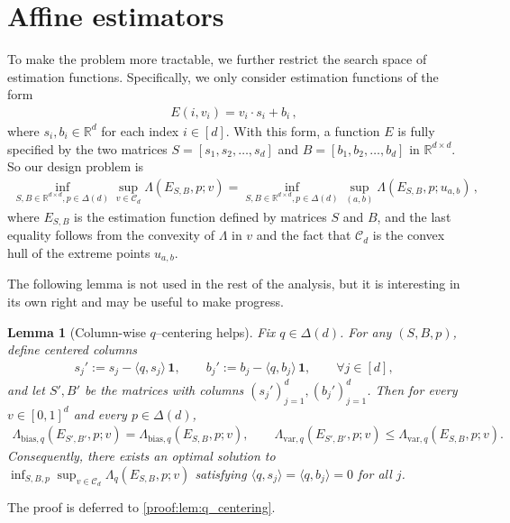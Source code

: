 \documentclass{article}
\theoremstyle{plain}
\newtheorem{lemma}[theorem]{Lemma}
\theoremstyle{definition}
\theoremstyle{plain}
\newcommand{\R}{\mathbb R}
\newcommand{\cC}{\mathcal C}
\begin{document}
\section{Affine estimators}
To make the problem more tractable, we further restrict the search space of estimation functions.
Specifically, we only consider estimation functions of the form
\begin{align}
    E(i, v_i) = v_i \cdot s_i + b_i\,,
\end{align}
where $s_i, b_i \in \R^d$ for each index $i \in [d]$.
With this form, a function $E$ is fully specified by the two matrices $S = [s_1, s_2, \ldots, s_d]$ and $B = [b_1, b_2, \ldots, b_d]$ in $\R^{d \times d}$.
So our design problem is
\begin{align}
    \inf_{S, B \in \R^{d \times d}, p \in \Delta(d)} \sup_{v \in \cC_d} \Lambda(E_{S,B},p; v)
    = \inf_{S, B \in \R^{d \times d}, p \in \Delta(d)} \sup_{(a,b)} \Lambda(E_{S,B},p; u_{a,b})\,,
\end{align}
where $E_{S,B}$ is the estimation function defined by matrices $S$ and $B$,
and the last equality follows from the convexity of $\Lambda$ in $v$ and the fact that $\cC_d$ is the convex hull of the extreme points $u_{a,b}$.

The following lemma is not used in the rest of the analysis, but it is interesting in its own right and may be useful to make progress.
\begin{lemma}[Column-wise $q$--centering helps]
    \label{lem:q_centering}
    Fix $q\in\Delta(d)$. For any $(S,B,p)$, define centered columns
    \begin{align}
        s_j' := s_j - \langle q,s_j\rangle\,\mathbf{1},
        \qquad
        b_j' := b_j - \langle q,b_j\rangle\,\mathbf{1},
        \qquad \forall j\in[d],
    \end{align}
    and let $S',B'$ be the matrices with columns $(s_j')_{j=1}^d,(b_j')_{j=1}^d$.
    Then for every $v\in[0,1]^d$ and every $p\in\Delta(d)$,
    \begin{align}
        \Lambda_{\text{bias},q}(E_{S',B'},p;v) = \Lambda_{\text{bias},q}(E_{S,B},p;v),
        \qquad
        \Lambda_{\text{var},q}(E_{S',B'},p;v) \le \Lambda_{\text{var},q}(E_{S,B},p;v).
    \end{align}
    Consequently, there exists an optimal solution to
    $\inf_{S,B,p}\sup_{v\in\cC_d}\Lambda_q(E_{S,B},p;v)$ satisfying
    $\langle q,s_j\rangle=\langle q,b_j\rangle=0$ for all $j$.
\end{lemma}
\noindent The proof is deferred to \ref{proof:lem:q_centering}.
\end{document}

